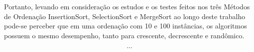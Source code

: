 \qquad Portanto, levando em consideração os estudos e os testes feitos
nos três Métodos de Ordenação InsertionSort, SelectionSort e
MergeSort ao longo deste trabalho pode-se perceber que em uma
ordenação com 10 e 100 instâncias, os algoritmos possuem o mesmo
desempenho, tanto para crescente, decrescente e randômico.

\[...\]